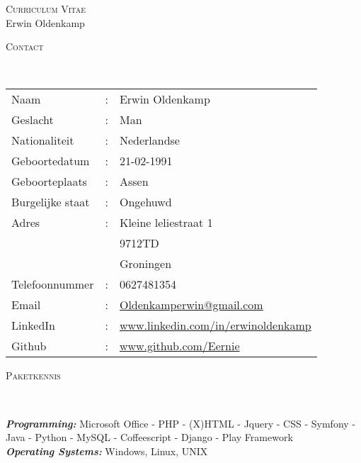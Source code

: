 \documentclass[9pt]{article}
\newenvironment{changemargin}[2]{%
  \begin{list}{}{%
    \setlength{\topsep}{0pt}%
    \setlength{\leftmargin}{#1}%
    \setlength{\rightmargin}{#2}%
    \setlength{\listparindent}{\parindent}%
    \setlength{\itemindent}{\parindent}%
    \setlength{\parsep}{\parskip}%
  }%
  \item[]}{\end{list}
}
\newcommand{\lineover}{
	\begin{changemargin}{-0.05in}{-0.05in}
		\vspace*{-8pt}
		\hrulefill \\
		\vspace*{-2pt}
	\end{changemargin}
}
\newcommand{\header}[1]{
	\begin{changemargin}{-0.5in}{-0.5in}
		\scshape{#1}\\
  	\lineover
	\end{changemargin}
}
\newcommand{\PageHead}[2]{
	\begin{changemargin}{-0.5in}{-0.5in}
		\begin{center}
			{\Large \scshape {#1}}\\ \smallskip
			{\Large {#2}}
		\end{center}
	\end{changemargin}
}
\newenvironment{body} {
	\vspace*{-16pt}
	\begin{changemargin}{-0.25in}{-0.5in}
  }	
	{\end{changemargin}
}
\begin{document}
\PageHead{Curriculum Vitae}{Erwin Oldenkamp}


\header{Contact}

\begin{body}
	\vspace{14pt}
	\begin{tabular}{l l l}
		Naam&:&Erwin Oldenkamp \\
		Geslacht&:&Man  \\
		Nationaliteit&:&Nederlandse \\
		Geboortedatum&:&21-02-1991 \\
		Geboorteplaats&:&Assen \\
		Burgelijke staat&:&Ongehuwd \\
		Adres&:&Kleine leliestraat 1 \\ 
		& & 9712TD \\ 
   		& & Groningen \\ 
		Telefoonnummer & : & 0627481354 \\
		Email &:&  \href{mailto:oldenkamperwin@gmail.com}{Oldenkamperwin@gmail.com}\\
		LinkedIn & : & \href{http://www.linkedin.com/in/erwinoldenkamp}{www.linkedin.com/in/erwinoldenkamp} \\
		Github & : & \href{http://www.github.com/Eernie}{www.github.com/Eernie} \\
	\end{tabular}
\end{body}

\smallskip

\header{Paketkennis}

\begin{body}
	\vspace{14pt}
	\emph{\textbf{Programming:}}{} Microsoft Office - PHP - (X)HTML - Jquery - CSS - Symfony - Java - Python - MySQL - Coffeescript - Django - Play Framework \\
	\medskip
	\emph{\textbf{Operating Systems:}}{} Windows, Linux, UNIX\\
\end{body}
\end{document}

